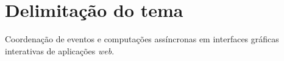 \section{Delimitação do tema}\label{ldelimitacao}

Coordenação de eventos e computações assíncronas em
interfaces gráficas interativas de aplicações \textit{web}.
